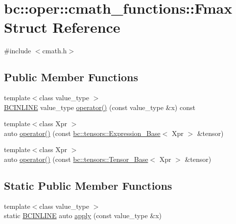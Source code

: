 \hypertarget{structbc_1_1oper_1_1cmath__functions_1_1Fmax}{}\section{bc\+:\+:oper\+:\+:cmath\+\_\+functions\+:\+:Fmax Struct Reference}
\label{structbc_1_1oper_1_1cmath__functions_1_1Fmax}


{\ttfamily \#include $<$cmath.\+h$>$}

\subsection*{Public Member Functions}
\begin{DoxyCompactItemize}
\item 
{\footnotesize template$<$class value\+\_\+type $>$ }\\\hyperlink{common_8h_a6699e8b0449da5c0fafb878e59c1d4b1}{B\+C\+I\+N\+L\+I\+NE} value\+\_\+type \hyperlink{structbc_1_1oper_1_1cmath__functions_1_1Fmax_aa76ab05e03975a0c42a3abcf50db4ed3}{operator()} (const value\+\_\+type \&x) const
\item 
{\footnotesize template$<$class Xpr $>$ }\\auto \hyperlink{structbc_1_1oper_1_1cmath__functions_1_1Fmax_af40c7a7b82d87f89fcfd4dfecfff4ce7}{operator()} (const \hyperlink{classbc_1_1tensors_1_1Expression__Base}{bc\+::tensors\+::\+Expression\+\_\+\+Base}$<$ Xpr $>$ \&tensor)
\item 
{\footnotesize template$<$class Xpr $>$ }\\auto \hyperlink{structbc_1_1oper_1_1cmath__functions_1_1Fmax_a1e2ee21217bf179f7a55191d300c1ef6}{operator()} (const \hyperlink{classbc_1_1tensors_1_1Tensor__Base}{bc\+::tensors\+::\+Tensor\+\_\+\+Base}$<$ Xpr $>$ \&tensor)
\end{DoxyCompactItemize}
\subsection*{Static Public Member Functions}
\begin{DoxyCompactItemize}
\item 
{\footnotesize template$<$class value\+\_\+type $>$ }\\static \hyperlink{common_8h_a6699e8b0449da5c0fafb878e59c1d4b1}{B\+C\+I\+N\+L\+I\+NE} auto \hyperlink{structbc_1_1oper_1_1cmath__functions_1_1Fmax_ab1f5d45b0298d150a017085e26852c59}{apply} (const value\+\_\+type \&x)
\end{DoxyCompactItemize}


